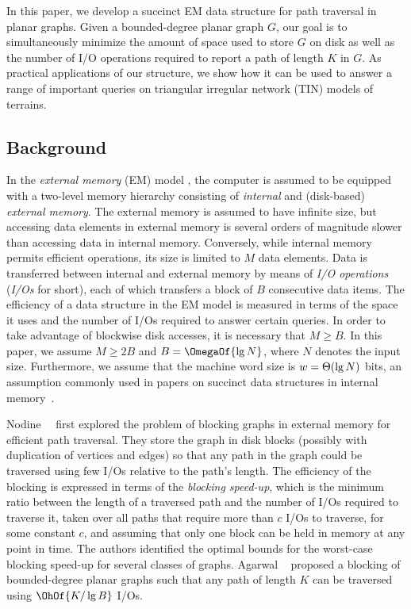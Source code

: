 In this paper, we develop a succinct EM data structure for path
traversal in planar graphs.
Given a bounded-degree planar graph $G$,
our goal is to simultaneously minimize the amount of space used to
store $G$ on disk as well as the number of I/O operations required to report
a path of length $K$ in $G$.
As practical applications of our
structure, we show how it can be used to answer a range of important
queries on triangular irregular network (TIN) models of terrains.

\subsection{Background}\label{sec:background}

In the \emph{external memory} (EM) model \cite{DBLP:journals/cacm/AggarwalV88}, the
computer is assumed to be equipped with a two-level memory hierarchy
consisting of \emph{internal} and (disk-based) \emph{external memory}.
The external memory is assumed to have infinite size, but accessing data
elements in external memory is several orders of magnitude slower than accessing
data in internal memory.
Conversely, while internal memory permits efficient operations, its size is limited
to $M$ data elements.
Data is transferred between internal and external memory by means of
\emph{I/O operations} (\emph{I/Os} for short), each of which transfers
a block of $B$ consecutive data items. 
The efficiency of a data structure in the EM model is measured in terms of the
space it uses and the number of I/Os required to answer certain queries.
In order to take advantage of blockwise disk accesses, it is necessary that $M
\ge B$.
In this paper, we assume $M \ge 2B$ and $B = \OmegaOf{\lg N}$,
where $N$ denotes the input size. Furthermore, we assume that the machine
word size is $w = \Theta(\lg N)$ bits, an assumption commonly used 
in papers on succinct data structures in internal 
memory~\cite{DBLP:journals/talg/RamanRS07}.

Nodine~\etal~\cite{ngv_1996} first explored the problem of blocking
graphs in external memory for efficient path traversal. They store the
 graph in disk blocks (possibly with duplication of
vertices and edges) so that any path in the graph could be traversed
using few I/Os relative to the path's length.
The efficiency of the blocking is expressed in terms
of the \emph{blocking speed-up}, which is the minimum ratio between
the length of a traversed path and the number of I/Os required to
traverse it, taken over all paths that require more than $c$ I/Os to
traverse, for some constant $c$, and assuming that only one block can
be held in memory at any point in time.
The authors identified the optimal bounds for the worst-case blocking speed-up
for several classes of graphs.
Agarwal \etal~\cite{DBLP:conf/soda/AgarwalAMVV98} proposed a
blocking of bounded-degree planar graphs such that any path of length
$K$ can be traversed using $\OhOf{K / \lg B}$ I/Os.

